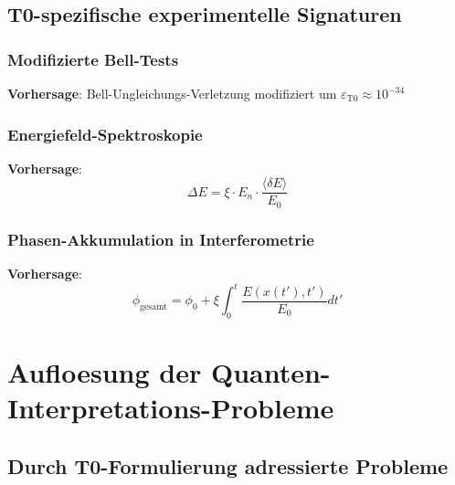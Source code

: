 \documentclass[12pt,a4paper]{article}
\newcommand{\xipar}{\xi}
\begin{document}
	\subsection{T0-spezifische experimentelle Signaturen}
	
	\subsubsection{Modifizierte Bell-Tests}
	
	\textbf{Vorhersage}: Bell-Ungleichungs-Verletzung modifiziert um $\varepsilon_{\mathrm{T0}} \approx 10^{-34}$
	
	\subsubsection{Energiefeld-Spektroskopie}
	
	\textbf{Vorhersage}: 
	\begin{equation}
		\Delta E = \xipar \cdot E_n \cdot \frac{\langle \delta E \rangle}{E_0}
	\end{equation}
	
	\subsubsection{Phasen-Akkumulation in Interferometrie}
	
	\textbf{Vorhersage}:
	\begin{equation}
		\phi_{\mathrm{gesamt}} = \phi_0 + \xipar \int_0^t \frac{E(x(t'), t')}{E_0} dt'
	\end{equation}
	
	\section{Aufloesung der Quanten-Interpretations-Probleme}
	
	\subsection{Durch T0-Formulierung adressierte Probleme}
	
\end{document}
